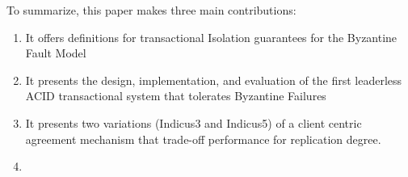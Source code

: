To summarize, this paper makes three main contributions:
\begin{enumerate}
\item It offers definitions for transactional Isolation guarantees for the Byzantine Fault Model
\item It presents the design, implementation, and evaluation of the first leaderless ACID transactional system that tolerates Byzantine Failures
\item It presents two variations (Indicus3 and Indicus5) of a client centric agreement mechanism that trade-off performance for replication degree.  
\item {}
\end{enumerate}

